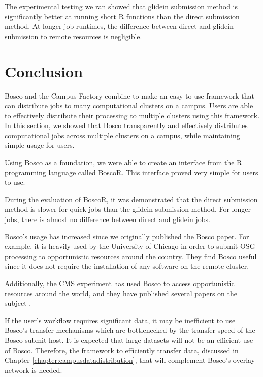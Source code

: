 The experimental testing we ran showed that glidein submission method is significantly better at running short R functions than the direct submission method.  At longer job runtimes, the difference between direct and glidein submission to remote resources is negligible.






\section{Conclusion}

Bosco and the Campus Factory combine to make an easy-to-use framework that can distribute jobs to many computational clusters on a campus.  Users are able to effectively distribute their processing to multiple clusters using this framework.  In this section, we showed that Bosco transparently and effectively distributes computational jobs across multiple clusters on a campus, while maintaining simple usage for users.

Using Bosco as a foundation, we were able to create an interface from the R programming language called BoscoR.  This interface proved very simple for users to use.  

During the evaluation of BoscoR, it was demonstrated that the direct submission method is slower for quick jobs than the glidein submission method.  For longer jobs, there is almost no difference between direct and glidein jobs.

Bosco's usage has increased since we originally published the Bosco paper.  For example, it is heavily used by the University of Chicago in order to submit OSG processing to opportunistic resources around the country.  They find Bosco useful since it does not require the installation of any software on the remote cluster.

Additionally, the CMS experiment has used Bosco to access opportunistic resources around the world, and they have published several papers on the subject \cite{hufnagelcmsopportunistic, piperovoperationalchep15, wagner2013using, kreuzer2014opportunistic}.

If the user's workflow requires significant data, it may be inefficient to use Bosco's transfer mechanisms which are bottlenecked by the transfer speed of the Bosco submit host.  It is expected that large datasets will not be an efficient use of Bosco.  Therefore, the framework to efficiently transfer data, discussed in Chapter \ref{chapter:campusdatadistribution}, that will complement Bosco's overlay network is needed.



